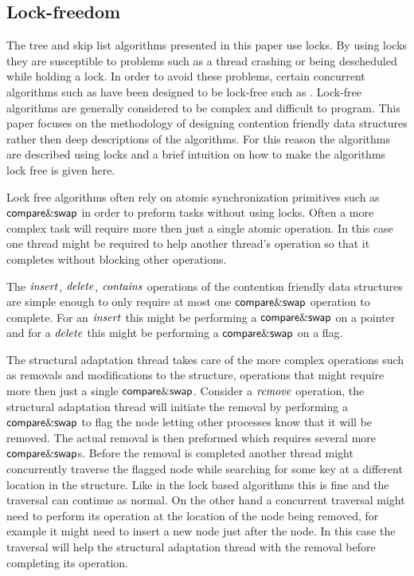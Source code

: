 \subsection{Lock-freedom}
The tree and skip list algorithms presented in this paper use locks.
By using locks they are susceptible to problems such as a thread crashing or being descheduled while holding a lock.
In order to avoid these problems, certain concurrent algorithms such as have been designed to be
lock-free such as \cite{Fra03}.
Lock-free algorithms are generally considered to be complex and difficult to program.
This paper focuses on the methodology of designing contention friendly data structures rather then
deep descriptions of the algorithms.
For this reason the algorithms are described using locks and a brief intuition on how to make
the algorithms lock free is given here.

Lock free algorithms often rely on atomic synchronization primitives such as $\lit{compare\&swap}$ in order to preform tasks without using locks.
Often a more complex task will require more then just a single atomic operation.
In this case one thread might be required to help another thread's operation so that it completes
without blocking other operations.

The $\ms{insert}$, $\ms{delete}$, $\ms{contains}$ operations of the contention friendly data structures are simple enough to only require
at most one $\lit{compare\&swap}$ operation to complete.
For an $\ms{insert}$ this might be performing a $\lit{compare\&swap}$ on a pointer and for a $\ms{delete}$ this might be
performing a $\lit{compare\&swap}$ on a flag.

The structural adaptation thread takes care of the more complex operations such as removals and
modifications to the structure, operations that might require more then just a single 
$\lit{compare\&swap}$.
Consider a $\ms{remove}$ operation, the structural adaptation thread will initiate the removal by performing a 
$\lit{compare\&swap}$
to flag the node letting other processes know that it will be removed.
The actual removal is then preformed which requires several more $\lit{compare\&swap}$s.
Before the removal is completed another thread might concurrently traverse the flagged node while searching for some key at a different location
in the structure.
Like in the lock based algorithms this is fine and the traversal can continue as normal.
On the other hand a concurrent traversal might need to perform its operation at the location of the node being removed,
for example it might need to insert a new node just after the node.
In this case the traversal will help the structural adaptation thread with the removal before completing its operation.

